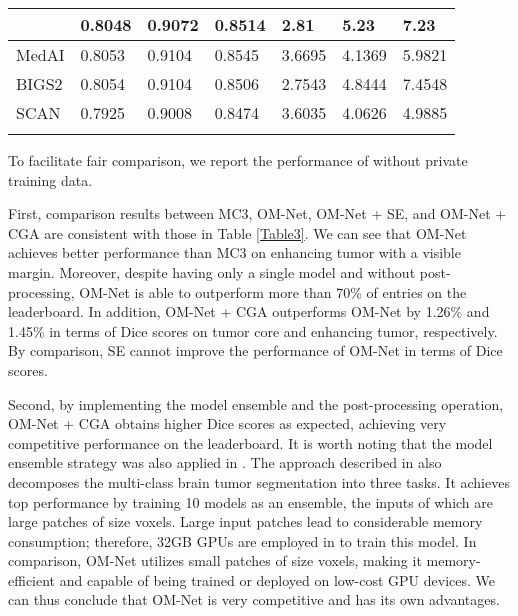 \documentclass[journal,twoside]{IEEEtran}
\begin{document}
\begin{table}
\begin{threeparttable}
\begin{tabular}{p{1.8cm}<{\centering}|p{0.65cm}<{\centering}|p{0.65cm}<{\centering}|p{0.65cm}<{\centering}|p{0.65cm}<{\centering}|p{0.65cm}<{\centering}|p{0.65cm}<{\centering}}
			&0.8048 &0.9072 &0.8514 &2.81 &5.23 &7.23 \\	 		 
			\hline				
			MedAI &0.8053 &0.9104 &0.8545 &3.6695 &4.1369 &5.9821  \\
			\hline
			BIGS2 &0.8054 &0.9104 &0.8506 &2.7543 &4.8444 &7.4548  \\
			\hline			
			SCAN &0.7925 &0.9008 &0.8474 &3.6035 &4.0626 &4.9885  \\			
			\shline				
		\end{tabular}
		\begin{tablenotes}
			\item[]To facilitate fair comparison, we report the performance of \cite{isensee2018no} without private training data.	
		\end{tablenotes}
	\end{threeparttable}
\end{table}


First, comparison results between MC3, OM-Net, OM-Net + SE, and OM-Net + CGA are consistent with those in Table \ref{Table3}. 
We can see that OM-Net achieves better performance than MC3 on enhancing tumor with a visible margin. Moreover, despite having only a single model and without post-processing, OM-Net is able to outperform more than 70\% of entries on the leaderboard. In addition, OM-Net + CGA outperforms OM-Net by 1.26\% and 1.45\% in terms of Dice scores on tumor core and enhancing tumor, respectively. By comparison, SE cannot improve the performance of OM-Net in terms of Dice scores. 



Second, by implementing the model ensemble and the post-processing operation, OM-Net + CGA obtains higher Dice scores as expected, achieving very competitive performance on the leaderboard. It is worth noting that the model ensemble strategy was also applied in \cite{kamnitsas2017ensembles,myronenko20183d,isensee2018no}. The approach described in \cite{myronenko20183d} also decomposes the multi-class brain tumor segmentation into three tasks. It achieves top performance by training 10 models as an ensemble, the inputs of which are large patches of size  voxels. Large input patches lead to considerable memory consumption; therefore, 32GB GPUs are employed in \cite{myronenko20183d} to train this model. In comparison, OM-Net utilizes small patches of size  voxels, making it memory-efficient and capable of being trained or deployed on low-cost GPU devices. We can thus conclude that OM-Net is very competitive and has its own advantages.  
\end{document}
